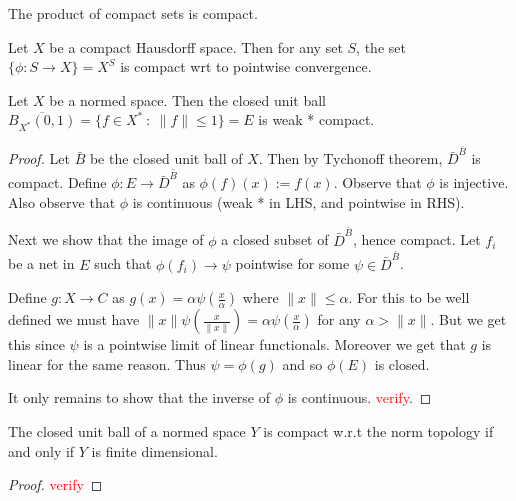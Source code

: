 
\begin{theorem}[Tychonoff]
  The product of compact sets is compact.
\end{theorem}
\begin{corollary}
  Let $X$ be a compact Hausdorff space. Then for any set $S$, the set
  $\{ \phi: S \to X \} = X^S$ is compact wrt to pointwise convergence.
\end{corollary}

\begin{theorem}
  Let $X$ be a normed space. Then the closed unit ball
  $\overline{B_{X^*}(0, 1)} = \{ f \in X^* \ : \ \|f\| \le 1 \} = E$
  is weak * compact.
\end{theorem}
\begin{proof}
  Let $\bar{B}$ be the closed unit ball of $X$. Then by Tychonoff
  theorem, $\bar{D}^{\bar{B}}$ is compact. Define $\phi: E \to
  \bar{D}^{\bar{B}}$ as $\phi(f)(x) := f(x)$. Observe that $\phi$ is injective.
  Also observe that $\phi$ is continuous (weak * in LHS, and pointwise in RHS).

  Next we show that the image of $\phi$ a closed subset of $\bar{D}^{
  \bar{B}}$, hence compact. Let $f_i$ be a net in $E$ such that
  $\phi(f_i) \to \psi$ pointwise for some $\psi \in \bar{D}^{\bar{B}}$.

  Define $g: X \to C$ as $g(x) = \alpha \psi( \frac{x}{ \alpha} )$
  where $\|x\| \le \alpha$. For this to be well defined we must have
  $\|x\| \psi(\frac{x}{\|x\|}) = \alpha \psi( \frac{x}{ \alpha})$ for
  any $ \alpha >  \|x\|$. But we get this since $\psi$ is a pointwise
  limit of linear functionals. Moreover we get that $g$ is linear for
  the same reason. Thus $\psi = \phi(g)$ and so $\phi(E)$ is closed.

  It only remains to show that the inverse of $\phi$ is continuous.
  \textcolor{red}{verify}.
\end{proof}

\begin{proposition}
  \label{ClosedUnitBallisCompactiffFiniteDim}
  The closed unit ball of a normed space $Y$ is compact w.r.t the
  norm topology if and only if $Y$ is finite dimensional.
\end{proposition}
\begin{proof}
  \textcolor{red}{verify}
\end{proof}

